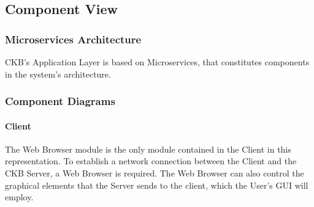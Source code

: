 \subsection{Component View}
\subsubsection{Microservices Architecture}
CKB's Application Layer is based on Microservices, that constitutes components in the system's architecture.
\newpage
\subsubsection{Component Diagrams}
\newpage

\paragraph{Client}
The Web Browser module is the only module contained in the Client in this representation.
To establish a network connection between the Client and the CKB Server, a Web Browser is required. The Web Browser can also control the graphical elements that the Server sends to the client, which the User's GUI will employ.

